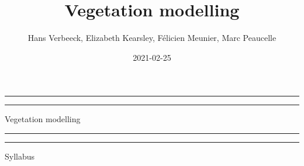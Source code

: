 \documentclass[12pt,oneside]{book}
\title{Vegetation modelling}
\author{Hans Verbeeck, Elizabeth Kearsley, Félicien Meunier, Marc Peaucelle}
\date{2021-02-25}
\begin{document}
\maketitle

\newcommand{\plogo}{\fbox{$\mathcal{PL}$}} %
\frontmatter


\begin{titlepage} %

	\centering %
	
	\scshape %
	
	\vspace*{\baselineskip} %
	
	
	\vspace{12\baselineskip}
	
	\rule{\textwidth}{1.6pt}\vspace*{-\baselineskip}\vspace*{2pt} %
	\rule{\textwidth}{0.4pt} %
	
	\vspace{0.75\baselineskip} %
	
	{\LARGE Vegetation modelling\\} %
	
	\vspace{0.75\baselineskip} %
	
	\rule{\textwidth}{0.4pt}\vspace*{-\baselineskip}\vspace{3.2pt} %
	\rule{\textwidth}{1.6pt} %
	
	\vspace{2\baselineskip} %
	
	
	Syllabus %
	
	\vspace*{3\baselineskip} %
	
	

\end{titlepage}
\end{document}
